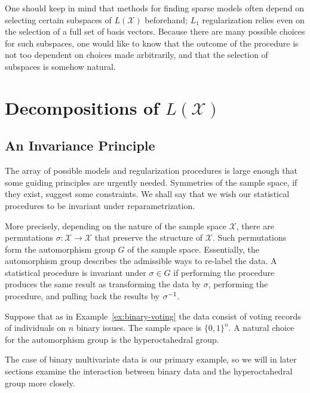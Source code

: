 \documentclass[cclicense]{hmcthesis}
\providecommand*{\xs}{\mathcal X}
\numberwithin{equation}{chapter}
\numberwithin{thmcounter}{chapter}
\begin{document}
    One should keep in mind that methods for finding sparse models often depend
    on selecting certain subspaces of $L(\xs)$ beforehand; $L_1$ regularization
    relies even on the selection of a full set of basis vectors.  Because there
    are many possible choices for such subspaces, one would like to know that
    the outcome of the procedure is not too dependent on choices made
    arbitrarily, and that the selection of subspaces is somehow natural.


\chapter{Decompositions of $L(\xs)$}

\section{An Invariance Principle}
    
    The array of possible models and regularization procedures is large enough
    that some guiding principles are urgently needed.  Symmetries of the sample
    space, if they exist, suggest some constraints.  We shall say that we wish
    our statistical procedures to be invariant under reparametrization.  

    More precisely, depending on the nature of the sample space $\xs$, there are
    permutations $\sigma: \xs \to \xs$ that preserve the structure of $\xs$.
    Such permutations form the automorphism group $G$ of the sample space.
    Essentially, the automorphism group describes the admissible ways to re-label
    the data.  A statistical procedure is invariant under $\sigma \in G$ if
    performing the procedure produces the same result as transforming the data
    by $\sigma$, performing the procedure, and pulling back the results by
    $\sigma^{-1}$.

    \begin{example}
        Suppose that as in Example~\ref{ex:binary-voting} the data consist of
        voting records of individuals on $n$ binary issues.  The sample space is
        $\{0, 1\}^n$.  A natural choice for the automorphism group is the
        hyperoctahedral group.  
        
        The case of binary multivariate data is our primary example, so we will
        in later sections examine the interaction between binary data and the
        hyperoctahedral group more closely.
    \end{example}
    
\end{document}
